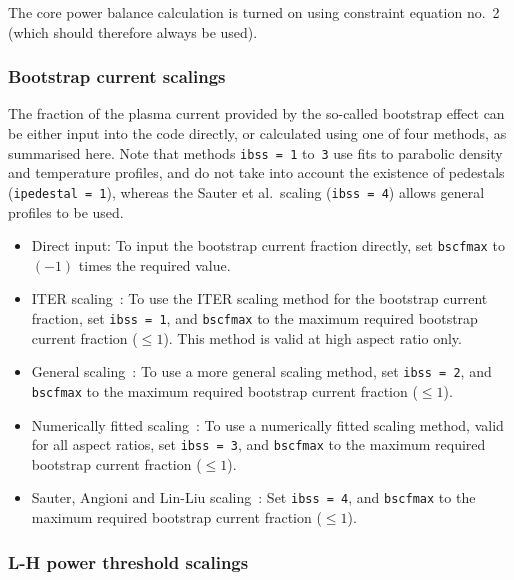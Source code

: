 \documentclass[11pt,a4paper]{report}
\begin{document}
The core power balance calculation is turned on using constraint equation
no.\ 2 (which should therefore always be used).

\subsubsection{Bootstrap current scalings}
\label{sec:bootstrap}

The fraction of the plasma current provided by the so-called bootstrap effect
can be either input into the code directly, or calculated using one of four
methods, as summarised here. Note that methods \texttt{ibss = 1} to~\texttt{3}
use fits to parabolic density and temperature profiles, and do not take into
account the existence of pedestals (\texttt{ipedestal = 1}), whereas the
Sauter et al.\ scaling (\texttt{ibss = 4}) allows general profiles to be used.
\begin{itemize}

\item Direct input: To input the bootstrap current fraction directly, set
  \texttt{bscfmax} to $(-1)$ times the required value.

\item ITER scaling~\cite{IPDG}: To use the ITER scaling method for the
  bootstrap current fraction, set \texttt{ibss = 1}, and \texttt{bscfmax} to
  the maximum required bootstrap current fraction ($\leq 1$). This method is
  valid at high aspect ratio only.

\item General scaling~\cite{Nevins}: To use a more general scaling method, set
  \texttt{ibss = 2}, and \texttt{bscfmax} to the maximum required bootstrap
  current fraction ($\leq 1$).

\item Numerically fitted scaling~\cite{WilsonBS}: To use a numerically fitted
  scaling method, valid for all aspect ratios, set \texttt{ibss = 3}, and
  \texttt{bscfmax} to the maximum required bootstrap current fraction ($\leq
  1$).

\item Sauter, Angioni and Lin-Liu scaling~\cite{SauterBS, SauterBS_errata}:
  Set \texttt{ibss = 4}, and \texttt{bscfmax} to the maximum required
  bootstrap current fraction ($\leq 1$).

\end{itemize}

\subsubsection{L-H power threshold scalings}
\end{document}
